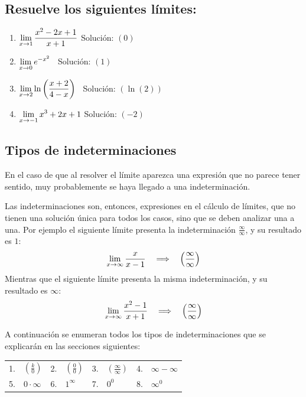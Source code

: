 \documentclass[sans]{apuntes}
\begin{document}
\begin{examplebox}
	\subsection*{Resuelve los siguientes límites:}
	\begin{enumerate}[label=\bfseries\arabic*)]
		\item \(\displaystyle\lim_{x \to 1} \frac{x^2 - 2x + 1}{x + 1}\) \quad \quad Solución: $(0)$
		\item \(\displaystyle\lim_{x \to 0} e^{-x^2}\) \quad \quad \quad \quad \;\ \quad Solución: $(1)$
		\item \(\displaystyle\lim_{x \to 2} \ln{\left(\frac{x + 2}{4 - x}\right)}\) \quad \quad \ Solución: $(\ln(2))$
		\item \(\displaystyle\lim_{x \to -1} x^3 + 2x + 1\) \quad \; Solución: $(-2)$
	\end{enumerate}
\end{examplebox}

\subsection{Tipos de indeterminaciones}
En el caso de que al resolver el límite aparezca una expresión que no parece tener sentido, muy probablemente se haya llegado a una indeterminación.
\par Las indeterminaciones son, entonces, expresiones en el cálculo de límites, que no tienen una solución única para todos los casos, sino que se deben analizar una a una. Por ejemplo el siguiente límite presenta la indeterminación $\frac{\infty}{\infty}$, y su resultado es $1$:
\[\displaystyle\lim_{x \to \infty}\frac{x}{x - 1} \quad \Longrightarrow \quad \left(\frac{\infty}{\infty}\right)\]
Mientras que el siguiente límite presenta la misma indeterminación, y su resultado es $\infty$:
\[\displaystyle\lim_{x \to \infty} \frac{x^2 - 1}{x + 1} \quad \Longrightarrow \quad \left(\frac{\infty}{\infty}\right)\]

A continuación se enumeran todos los tipos de indeterminaciones que se explicarán en las secciones siguientes:
\begin{table}[!ht]
	\centering
	\begin{tabular}{clclclcl}
		1. & \(\left(\frac{k}{0}\right)\) & 2. & \(\left(\frac{0}{0}\right)\)\quad & 3. & \(\left(\frac{\infty}{\infty}\right)\) & 4. & \(\infty - \infty\) \\
		5. & \(0 \cdot \infty\) \quad & 6. & \(1^\infty\) & 7. & \(0^0\) & 8. & \(\infty^0\) \\
	\end{tabular}
\end{table}
\end{document}
